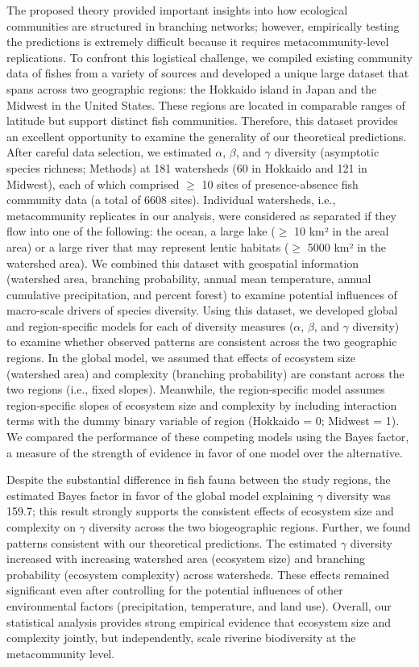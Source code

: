 \documentclass[
]{article}
\begin{document}
The proposed theory provided important insights into how ecological
communities are structured in branching networks; however, empirically
testing the predictions is extremely difficult because it requires
metacommunity-level replications. To confront this logistical challenge,
we compiled existing community data of fishes from a variety of sources
and developed a unique large dataset that spans across two geographic
regions: the Hokkaido island in Japan and the Midwest in the United
States. These regions are located in comparable ranges of latitude but
support distinct fish communities. Therefore, this dataset provides an
excellent opportunity to examine the generality of our theoretical
predictions. After careful data selection, we estimated \(\alpha\),
\(\beta\), and \(\gamma\) diversity (asymptotic species richness;
Methods) at 181 watersheds (60 in Hokkaido and 121 in Midwest), each of
which comprised \(\ge\) 10 sites of presence-absence fish community data
(a total of 6608 sites). Individual watersheds, i.e., metacommunity
replicates in our analysis, were considered as separated if they flow
into one of the following: the ocean, a large lake (\(\ge\) 10 km² in
the areal area) or a large river that may represent lentic habitats
(\(\ge\) 5000 km² in the watershed area). We combined this dataset with
geospatial information (watershed area, branching probability, annual
mean temperature, annual cumulative precipitation, and percent forest)
to examine potential influences of macro-scale drivers of species
diversity. Using this dataset, we developed global and region-specific
models for each of diversity measures (\(\alpha\), \(\beta\), and
\(\gamma\) diversity) to examine whether observed patterns are
consistent across the two geographic regions. In the global model, we
assumed that effects of ecosystem size (watershed area) and complexity
(branching probability) are constant across the two regions (i.e., fixed
slopes). Meanwhile, the region-specific model assumes region-specific
slopes of ecosystem size and complexity by including interaction terms
with the dummy binary variable of region (Hokkaido = 0; Midwest = 1). We
compared the performance of these competing models using the Bayes
factor, a measure of the strength of evidence in favor of one model over
the alternative.

Despite the substantial difference in fish fauna between the study
regions, the estimated Bayes factor in favor of the global model
explaining \(\gamma\) diversity was 159.7; this result strongly supports
the consistent effects of ecosystem size and complexity on \(\gamma\)
diversity across the two biogeographic regions. Further, we found
patterns consistent with our theoretical predictions. The estimated
\(\gamma\) diversity increased with increasing watershed area (ecosystem
size) and branching probability (ecosystem complexity) across
watersheds. These effects remained significant even after controlling
for the potential influences of other environmental factors
(precipitation, temperature, and land use). Overall, our statistical
analysis provides strong empirical evidence that ecosystem size and
complexity jointly, but independently, scale riverine biodiversity at
the metacommunity level.
\end{document}
